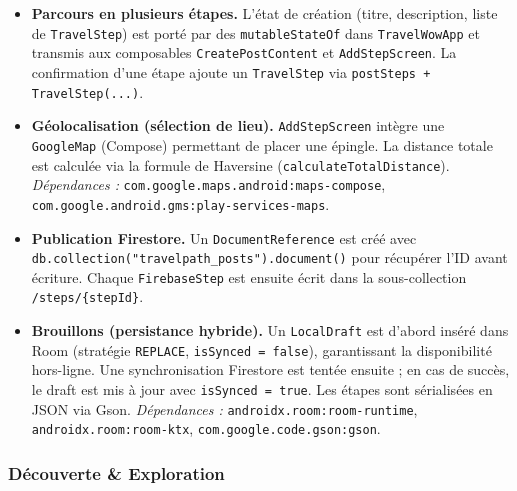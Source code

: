 \documentclass[a4paper, 12pt]{article}
\begin{document}
\begin{justify}
\begin{itemize}

    \item \textbf{Parcours en plusieurs étapes.}
    L'état de création (titre, description, liste de \texttt{TravelStep}) est porté par des \texttt{mutableStateOf} dans \texttt{TravelWowApp} et transmis aux composables \texttt{CreatePostContent} et \texttt{AddStepScreen}. La confirmation d'une étape ajoute un \texttt{TravelStep} via \texttt{postSteps + TravelStep(...)}.

    \item \textbf{Géolocalisation (sélection de lieu).}
    \texttt{AddStepScreen} intègre une \texttt{GoogleMap} (Compose) permettant de placer une épingle. La distance totale est calculée via la formule de Haversine (\texttt{calculateTotalDistance}).
    \newline\textit{Dépendances :} \texttt{com.\allowbreak{}google.\allowbreak{}maps.\allowbreak{}android:\allowbreak{}maps-compose}, \texttt{com.\allowbreak{}google.\allowbreak{}android.\allowbreak{}gms:\allowbreak{}play-services-maps}.

    \item \textbf{Publication Firestore.}
    Un \texttt{DocumentReference} est créé avec \texttt{db.\allowbreak{}collection("travelpath\_posts").\allowbreak{}document()} pour récupérer l'ID avant écriture. Chaque \texttt{FirebaseStep} est ensuite écrit dans la sous-collection \texttt{/\allowbreak{}steps/\allowbreak{}\{stepId\}}.

    \item \textbf{Brouillons (persistance hybride).}
    Un \texttt{LocalDraft} est d'abord inséré dans Room (stratégie \texttt{REPLACE}, \texttt{isSynced = false}), garantissant la disponibilité hors-ligne. Une synchronisation Firestore est tentée ensuite ; en cas de succès, le draft est mis à jour avec \texttt{isSynced = true}. Les étapes sont sérialisées en JSON via Gson.
    \newline\textit{Dépendances :} \texttt{androidx.\allowbreak{}room:\allowbreak{}room-runtime}, \texttt{androidx.\allowbreak{}room:\allowbreak{}room-ktx}, \texttt{com.\allowbreak{}google.\allowbreak{}code.\allowbreak{}gson:\allowbreak{}gson}.

\end{itemize}

\subsubsection*{Découverte \& Exploration}


\end{justify}
\end{document}
